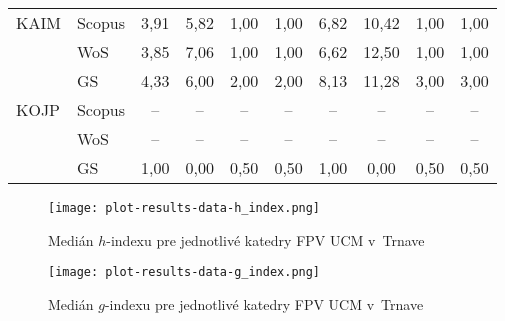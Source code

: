 {\begin{table}
\begin{tabularx}{\textwidth}{XXcccc@{\hspace{3ex}}cccc}
 KAIM & Scopus & 3,91    & 5,82  & 1,00  & 1,00  & 6,82    & 10,42 & 1,00  & 1,00  \\
      & WoS    & 3,85    & 7,06  & 1,00  & 1,00  & 6,62    & 12,50 & 1,00  & 1,00  \\
      & GS     & 4,33    & 6,00  & 2,00  & 2,00  & 8,13    & 11,28 & 3,00  & 3,00  \\[3ex]
 KOJP & Scopus & --      & --    & --    & --    & --      & --    & --    & --    \\
      & WoS    & --      & --    & --    & --    & --      & --    & --    & --    \\
      & GS     & 1,00    & 0,00  & 0,50  & 0,50  & 1,00    & 0,00  & 0,50  & 0,50  \\[0.5ex]
  \bottomrule
\end{tabularx}
\end{table}

\begin{figure}
  \centering
  \texttt{[image: plot-results-data-h\_index.png]}
  \caption{Medián $h$-indexu pre jednotlivé katedry FPV UCM v~Trnave}
  \label{fig:h-index.plot}
\end{figure}

\begin{figure}
  \centering
  \texttt{[image: plot-results-data-g\_index.png]}
  \caption{Medián $g$-indexu pre jednotlivé katedry FPV UCM v~Trnave}
  \label{fig:g-index.plot}
\end{figure}


}

